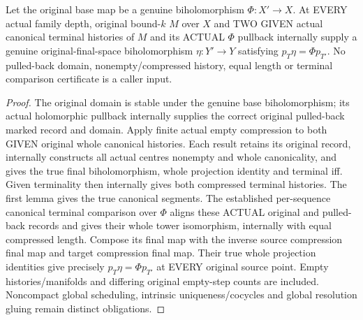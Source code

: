 \begin{theorem}
\label{hir:original-terminal-histories-actual-biholomorphic-base-comparison}
\leanok
Let the original base map be a genuine biholomorphism $\Phi:X'\to X$.
At EVERY actual family depth, original bound-$k$ $M$ over $X$ and TWO
GIVEN actual canonical terminal histories of $M$ and its ACTUAL $\Phi$
pullback internally supply a genuine original-final-space biholomorphism
$\eta:Y'\to Y$ satisfying $p_T\eta=\Phi p_{T'}$. No pulled-back domain,
nonempty/compressed history, equal length or terminal comparison certificate
is a caller input.
\end{theorem}
\begin{proof}
The original domain is stable under the genuine base biholomorphism;
its actual holomorphic pullback internally supplies the correct original
pulled-back marked record and domain. Apply finite actual empty compression
to both GIVEN original whole canonical histories. Each result retains its
original record, internally constructs all actual centres nonempty and
whole canonicality, and gives the true final biholomorphism, whole
projection identity and terminal iff. Given terminality then internally
gives both compressed terminal histories. The first lemma gives the
true canonical segments. The established per-sequence canonical terminal
comparison over $\Phi$ aligns these ACTUAL original and pulled-back
records and gives their whole tower isomorphism, internally with equal
compressed length. Compose its final map with the inverse source
compression final map and target compression final map. Their true whole
projection identities give precisely $p_T\eta=\Phi p_{T'}$ at EVERY
original source point. Empty histories/manifolds and differing original
empty-step counts are included. Noncompact global scheduling, intrinsic
uniqueness/cocycles and global resolution gluing remain distinct obligations.
\end{proof}

